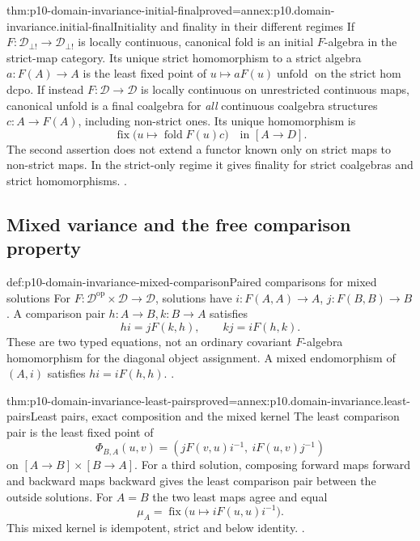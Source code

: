 \begin{hbtheorem}{thm:p10-domain-invariance-initial-final}{proved=annex:p10.domain-invariance.initial-final}{Initiality and finality in their different regimes}
If \(F:\mathcal D_{\bot!}\to\mathcal D_{\bot!}\) is
locally continuous, canonical fold is an initial \(F\)-algebra
in the strict-map category. Its unique strict homomorphism to a
strict algebra \(a:F(A)\to A\) is the least fixed point of
\(u\mapsto aF(u)\operatorname{unfold}\) on the strict hom dcpo.
If instead \(F:\mathcal D\to\mathcal D\) is locally continuous
on unrestricted continuous maps, canonical unfold is a final
coalgebra for \emph{all} continuous coalgebra structures
\(c:A\to F(A)\), including non-strict ones. Its unique
homomorphism is
\[
 \operatorname{fix}\bigl(u\mapsto\operatorname{fold}F(u)c\bigr)
                              \quad\text{in }[A\longrightarrow D].
\]
The second assertion does not extend a functor known only on strict
maps to non-strict maps. In the strict-only regime it gives finality
for strict coalgebras and strict homomorphisms.
\cite[Theorems~5.3.4--5; Exercise~5.4.11(6), pp.~77,83]
{AbramskyJungCorrectedExpandedDomainTheory}.
\end{hbtheorem}

\subsection{Mixed variance and the free comparison property}

\begin{hbdefinition}{def:p10-domain-invariance-mixed-comparison}{Paired comparisons for mixed solutions}
For \(F:\mathcal D^{\mathrm{op}}\times\mathcal D\to\mathcal D\),
solutions have \(i:F(A,A)\to A\), \(j:F(B,B)\to B\).
A comparison pair \(h:A\to B,k:B\to A\) satisfies
\[
 hi=jF(k,h),\qquad kj=iF(h,k).
\]
These are two typed equations, not an ordinary covariant
\(F\)-algebra homomorphism for the diagonal object assignment.
A mixed endomorphism of \((A,i)\) satisfies \(hi=iF(h,h)\).
\cite[Lemma~5.3.6, pp.~77--78]
{AbramskyJungCorrectedExpandedDomainTheory}.
\end{hbdefinition}

\begin{hbtheorem}{thm:p10-domain-invariance-least-pairs}{proved=annex:p10.domain-invariance.least-pairs}{Least pairs, exact composition and the mixed kernel}
The least comparison pair is the least fixed point of
\[
 \Phi_{B,A}(u,v)
       =(jF(v,u)i^{-1},\ iF(u,v)j^{-1})
\]
on \([A\longrightarrow B]\times[B\longrightarrow A]\).
For a third solution, composing forward maps forward and backward
maps backward gives the least comparison pair between the outside
solutions. For \(A=B\) the two least maps agree and equal
\[
 \mu_A=\operatorname{fix}\bigl(u\mapsto iF(u,u)i^{-1}\bigr).
\]
This mixed kernel is idempotent, strict and below identity.
\cite[Lemma~5.3.6 and its corrected-author comment, p.~78]
{AbramskyJungCorrectedExpandedDomainTheory}.
\end{hbtheorem}

